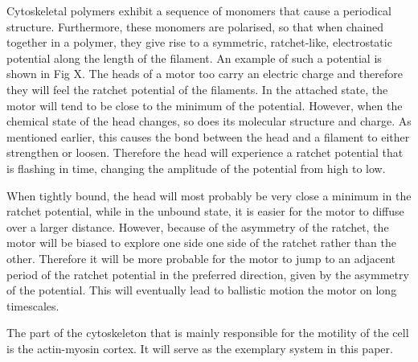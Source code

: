 \documentclass[aps,pre,onecolumn,showpacs,showkeys,a4paper]{revtex4}
\begin{document}
Cytoskeletal polymers exhibit a sequence of monomers that cause a periodical structure. 
Furthermore, these monomers are polarised, so that when chained together in a polymer, they give rise to a symmetric, ratchet-like, electrostatic potential along the length of the filament. 
An example of such a potential is shown in Fig X. %
The heads of a motor too carry an electric charge and therefore they will feel the ratchet potential of the filaments. 
In the attached state, the motor will tend to be close to the minimum of the potential. 
However, when the chemical state of the head changes, so does its molecular structure and charge. 
As mentioned earlier, this causes the bond between the head and a filament to either strengthen or loosen. 
Therefore the head will experience a ratchet potential that is flashing in time, changing the amplitude of the potential from high to low.

When tightly bound, the head will most probably be very close a minimum in the ratchet potential, while in the unbound state, it is easier for the motor to diffuse over a larger distance. 
However, because of the asymmetry of the ratchet, the motor will be biased to explore one side one side of the ratchet rather than the other. 
Therefore it will be more probable for the motor to jump to an adjacent period of the ratchet potential in the preferred direction, given by the asymmetry of the potential. 
This will eventually lead to ballistic motion the motor on long timescales.

The part of the cytoskeleton that is mainly responsible for the motility of the cell is the actin-myosin cortex.  It will serve as the exemplary system in this paper.
\end{document}

